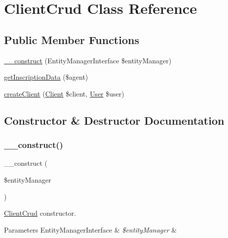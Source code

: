 \hypertarget{class_app_1_1_d_a_l_1_1_client_crud}{}\section{Client\+Crud Class Reference}
\label{class_app_1_1_d_a_l_1_1_client_crud}
\subsection*{Public Member Functions}
\begin{DoxyCompactItemize}
\item 
\mbox{\hyperlink{class_app_1_1_d_a_l_1_1_client_crud_abb5fb9a65dd8a81e7482dddbf71c5177}{\+\_\+\+\_\+construct}} (Entity\+Manager\+Interface \$entity\+Manager)
\item 
\mbox{\hyperlink{class_app_1_1_d_a_l_1_1_client_crud_a98ddf8e568810488fd589cab24b8782d}{get\+Inscription\+Data}} (\$agent)
\item 
\mbox{\hyperlink{class_app_1_1_d_a_l_1_1_client_crud_a2fa3d0faf31916c336b00ac00e3b91d4}{create\+Client}} (\mbox{\hyperlink{class_app_1_1_entity_1_1_client}{Client}} \$client, \mbox{\hyperlink{class_app_1_1_entity_1_1_user}{User}} \$user)
\end{DoxyCompactItemize}


\subsection{Constructor \& Destructor Documentation}
\mbox{\label{class_app_1_1_d_a_l_1_1_client_crud_abb5fb9a65dd8a81e7482dddbf71c5177}} 
\subsubsection{\texorpdfstring{\_\_construct()}{\_\_construct()}}
{\footnotesize\ttfamily \+\_\+\+\_\+construct (\begin{DoxyParamCaption}\item[{Entity\+Manager\+Interface}]{\$entity\+Manager }\end{DoxyParamCaption})}

\mbox{\hyperlink{class_app_1_1_d_a_l_1_1_client_crud}{Client\+Crud}} constructor. 
\begin{DoxyParams}[1]{Parameters}
Entity\+Manager\+Interface & {\em \$entity\+Manager} & \\
\hline
\end{DoxyParams}


